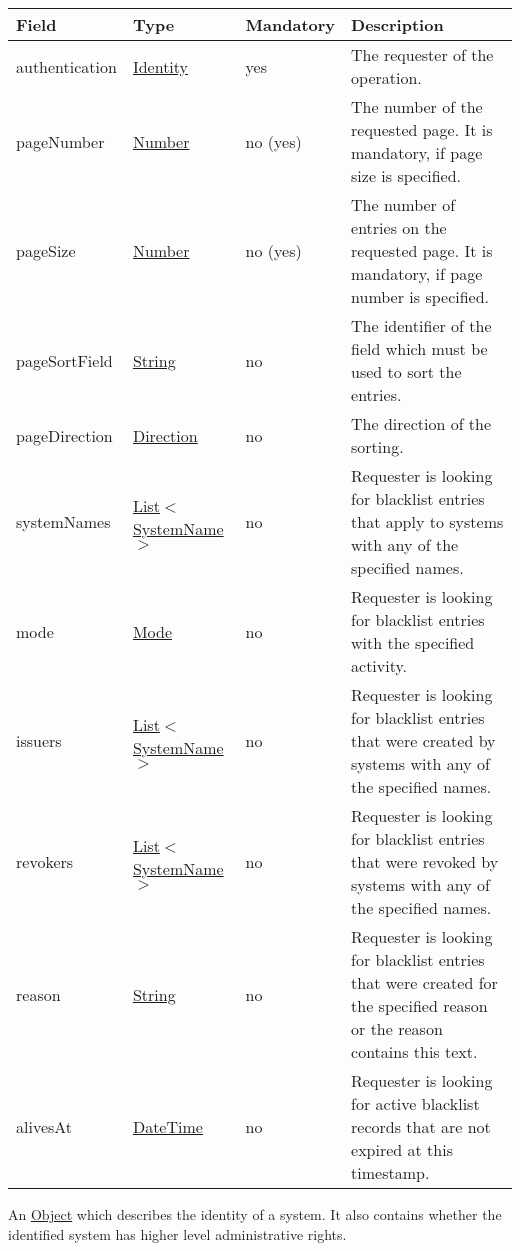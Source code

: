 \documentclass[a4paper]{arrowhead}
\newcommand{\pref}[1]{{\textcolor{ArrowheadGrey}{\hyperref[sec:model:primitives:#1]{#1}}}}
\begin{document}
\begin{table}[ht!]
\begin{tabularx}{\textwidth}{| p{3cm} | p{3.5cm} | p{1.75cm} | X |} \hline
\rowcolor{gray!33} Field & Type & Mandatory & Description \\ \hline
authentication & \hyperref[sec:model:Identity]{Identity} & yes & The requester of the operation. \\ \hline
pageNumber & \pref{Number} & no (yes) & The number of the requested page. It is mandatory, if page size is specified. \\ \hline
pageSize & \pref{Number} & no (yes) & The number of entries on the requested page. It is mandatory, if page number is specified. \\ \hline
pageSortField & \pref{String} & no & The identifier of the field which must be used to sort the entries. \\ \hline
pageDirection & \pref{Direction} & no & The direction of the sorting. \\ \hline
systemNames & \pref{List}$<$\pref{SystemName}$>$ & no & Requester is looking for blacklist entries that apply to systems with any of the specified names. \\ \hline
mode & \pref{Mode} & no & Requester is looking for blacklist entries with the specified activity. \\ \hline
issuers & \pref{List}$<$\pref{SystemName}$>$ & no & Requester is looking for blacklist entries that were created by systems with any of the specified names. \\ \hline
revokers & \pref{List}$<$\pref{SystemName}$>$ & no & Requester is looking for blacklist entries that were revoked by systems with any of the specified names. \\ \hline
reason & \pref{String} & no & Requester is looking for blacklist entries that were created for the specified reason or the reason contains this text. \\ \hline
alivesAt & \pref{DateTime} & no & Requester is looking for active blacklist records that are not expired at this timestamp. \\ \hline
\end{tabularx}
\end{table}


An \pref{Object} which describes the identity of a system. It also contains whether the identified system has higher level administrative rights.

\clearpage
\end{document}
